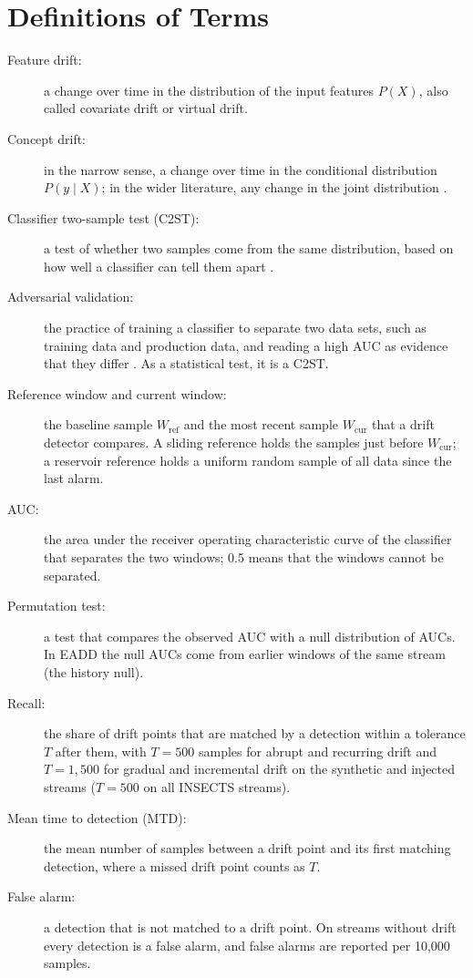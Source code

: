 \section{Definitions of Terms}
\begin{description}
    \item[Feature drift:] a change over time in the distribution of the input features $P(X)$, also called covariate drift or virtual drift.
    \item[Concept drift:] in the narrow sense, a change over time in the conditional distribution $P(y \mid X)$; in the wider literature, any change in the joint distribution \citep{Gama2014, Lu2018}.
    \item[Classifier two-sample test (C2ST):] a test of whether two samples come from the same distribution, based on how well a classifier can tell them apart \citep{LopezPazOquab2017}.
    \item[Adversarial validation:] the practice of training a classifier to separate two data sets, such as training data and production data, and reading a high AUC as evidence that they differ \citep{Pan2020}. As a statistical test, it is a C2ST.
    \item[Reference window and current window:] the baseline sample $W_{\mathrm{ref}}$ and the most recent sample $W_{\mathrm{cur}}$ that a drift detector compares. A sliding reference holds the samples just before $W_{\mathrm{cur}}$; a reservoir reference holds a uniform random sample of all data since the last alarm.
    \item[AUC:] the area under the receiver operating characteristic curve of the classifier that separates the two windows; 0.5 means that the windows cannot be separated.
    \item[Permutation test:] a test that compares the observed AUC with a null distribution of AUCs. In EADD the null AUCs come from earlier windows of the same stream (the history null).
    \item[Recall:] the share of drift points that are matched by a detection within a tolerance $T$ after them, with $T = 500$ samples for abrupt and recurring drift and $T = 1{,}500$ for gradual and incremental drift on the synthetic and injected streams ($T = 500$ on all INSECTS streams).
    \item[Mean time to detection (MTD):] the mean number of samples between a drift point and its first matching detection, where a missed drift point counts as $T$.
    \item[False alarm:] a detection that is not matched to a drift point. On streams without drift every detection is a false alarm, and false alarms are reported per 10{,}000 samples.
\end{description}

